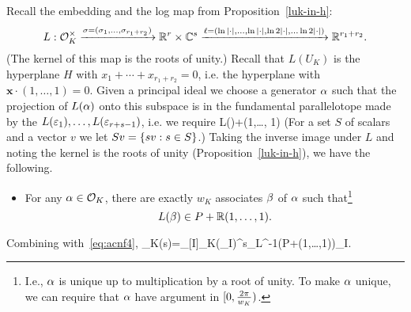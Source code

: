Recall the embedding and the log map from Proposition~\ref{luk-in-h}:
\[
L:\mathcal{O}_K^{\times}\xrightarrow{\sigma=(\sigma_1,\ldots, \sigma_{r_1+r_2})}\mathbb{R}^r\times \mathbb{C}^s \xrightarrow{\ell=(\ln|\cdot|,\ldots, \ln |\cdot|, \ln 2|\cdot|,\ldots \ln 2|\cdot|)} \mathbb{R}^{r_1+r_2}.
\]
(The kernel of this map is the roots of unity.) Recall that $L(U_K)$ is the hyperplane $H$ with $x_1+\cdots +x_{r_1+r_2}=0$, i.e. the hyperplane with $\mathbf x\cdot (1,\ldots, 1)=0$.
Given a principal ideal we choose a generator $\alpha$ such that the projection of $L(\alpha)$ onto this subspace is in the fundamental parallelotope made by the $L(\varepsilon_1),\ldots, L(\varepsilon_{r+s-1})$, i.e. we require
L(\al)\in {}+\R(1,\ldots, 1)
\eeq
(For a set $S$ of scalars and a vector $v$ we let $Sv=\left\{{sv}:{s\in S}\right\}$.) 
Taking the inverse image under $L$ and noting the kernel is the roots of unity (Proposition~\ref{luk-in-h}), we have the following.
\begin{itemize}
\item
For any $\alpha\in \mathcal{O}_K$, there are exactly $w_K$ associates $\beta$ of $\alpha$ such that\footnote{I.e., $\alpha$ is unique up to multiplication by a root of unity. To make $\alpha$ unique, we can require that $\alpha$ have argument in $[0,\frac{2\pi}{w_K})$.}
\[L(\beta)\in P+\mathbb{R}(1,\ldots, 1).\]%
\end{itemize}
Combining with~\eqref{eq:acnf4},
\ze_K(s)=\sum_{[I]\in\Cl_K}\fN(\mb_I)^s\sum_{\al\in L^{-1}(P+\R(1,\ldots,1))\cap \mb_I}.
\eeq

